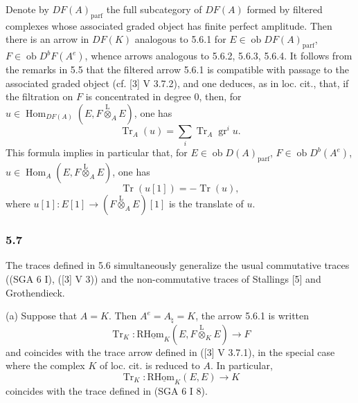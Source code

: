 \documentclass[11pt]{article}
\DeclareMathOperator{\Hom}{Hom}
\newcommand{\ob}{\operatorname{ob}}
\providecommand{\Tr}{\operatorname{Tr}}
\providecommand{\Tr}{\operatorname{Tr}}
\providecommand{\lten}{\overset{\mathrm L}{\otimes}}
\providecommand{\Tr}{\operatorname{Tr}}
\providecommand{\Hom}{\operatorname{Hom}}
\providecommand{\ob}{\operatorname{ob}}
\providecommand{\lten}{\overset{\mathrm L}{\otimes}}
\providecommand{\lten}{\overset{\mathrm L}{\otimes}}
\providecommand{\Tr}{\operatorname{Tr}}
\providecommand{\lten}{\overset{\mathrm L}{\otimes}}
\providecommand{\lten}{\overset{\mathrm L}{\otimes}}
\providecommand{\lten}{\overset{\mathrm L}{\otimes}}
\providecommand{\Hom}{\operatorname{Hom}}
\providecommand{\Tr}{\operatorname{Tr}}
\providecommand{\lten}{\overset{\mathrm L}{\otimes}}
\begin{document}
Denote by $DF(A)_{\mathrm{parf}}$ the full subcategory of $DF(A)$ formed by filtered complexes whose associated graded object has finite perfect amplitude. Then there is an arrow in $DF(K)$ analogous to 5.6.1 for $E\in\ob DF(A)_{\mathrm{parf}}$, $F\in\ob D^bF(A^e)$, whence arrows analogous to 5.6.2, 5.6.3, 5.6.4. It follows from the remarks in 5.5 that the filtered arrow 5.6.1 is compatible with passage to the associated graded object (cf. [3] V 3.7.2), and one deduces, as in loc. cit., that, if the filtration on $F$ is concentrated in degree $0$, then, for $u\in\Hom_{DF(A)}(E,F\lten_AE)$, one has
\begin{equation}\tag{5.6.5}
\Tr_A(u)=\sum_i\Tr_A\operatorname{gr}^i u.
\end{equation}
This formula implies in particular that, for $E\in\ob D(A)_{\mathrm{parf}}$, $F\in\ob D^b(A^e)$, $u\in\Hom_A(E,F\lten_AE)$, one has
\begin{equation}\tag{5.6.6}
\Tr(u[1])=-\Tr(u),
\end{equation}
where $u[1]:E[1]\to(F\lten_AE)[1]$ is the translate of $u$.

\subsubsection*{5.7}

The traces defined in 5.6 simultaneously generalize the usual commutative traces ((SGA 6 I), ([3] V 3)) and the non-commutative traces of Stallings [5] and Grothendieck.

(a) Suppose that $A=K$. Then $A^e=A_\natural=K$, the arrow 5.6.1 is written
\[
\Tr_K:\mathrm{R}\underline{\mathrm{Hom}}_K(E,F\lten_KE)\longrightarrow F
\]
and coincides with the trace arrow defined in ([3] V 3.7.1), in the special case where the complex $K$ of loc. cit. is reduced to $A$. In particular,
\[
\Tr_K:\mathrm{R}\underline{\mathrm{Hom}}_K(E,E)\longrightarrow K
\]
coincides with the trace defined in (SGA 6 I 8).
\end{document}
